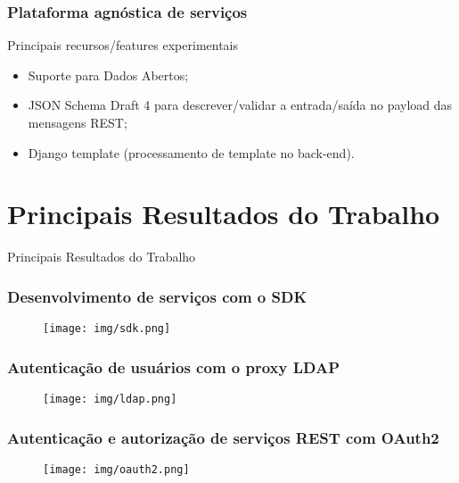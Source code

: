 \documentclass{beamer}
\begin{document}
\begin{frame}
  \frametitle{Plataforma agnóstica de serviços}

  \begin{exampleblock}{Principais recursos/features experimentais}
  
	  \begin{itemize}
 	    \item<1->Suporte para Dados Abertos;
    	    \item<1->JSON Schema Draft 4 para descrever/validar a entrada/saída no payload das mensagens REST;
	    \item<1->Django template (processamento de template no back-end).
	  \end{itemize}

  \end{exampleblock}

  
\end{frame}







\section{Principais Resultados do Trabalho}


\begin{frame}[c]{ }
\centering
  \huge{Principais Resultados do Trabalho}
\end{frame}



\begin{frame}
  \frametitle{Desenvolvimento de serviços com o SDK}

	\begin{figure}
	\centering
		\texttt{[image: img/sdk.png]}
	\end{figure}
  
\end{frame}


\begin{frame}
  \frametitle{Autenticação de usuários com o proxy LDAP}

	\begin{figure}
	\centering
		\texttt{[image: img/ldap.png]}
	\end{figure}
  
\end{frame}


\begin{frame}
  \frametitle{Autenticação e autorização de serviços REST com OAuth2}

	\begin{figure}
	\centering
		\texttt{[image: img/oauth2.png]}
	\end{figure}
  
\end{frame}
\end{document}
